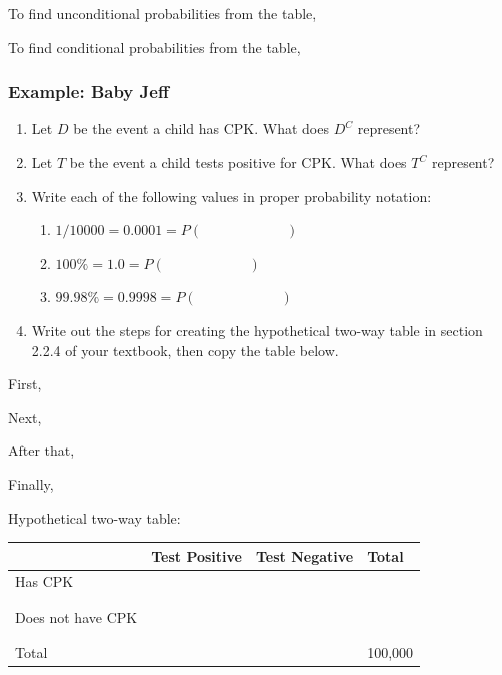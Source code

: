 \documentclass[
]{report}
\providecommand{\tightlist}{%
  \setlength{\itemsep}{0pt}\setlength{\parskip}{0pt}}
\newcommand{\rgs}{\vspace{12pt}} %
\newcommand{\rgi}{\hspace{24pt}}  %
\begin{document}
\rgi \rgi To find unconditional probabilities from the table,
\rgs

\rgi \rgi To find conditional probabilities from the table,
\rgs

\hypertarget{example-baby-jeff}{%
\subsubsection*{Example: Baby Jeff}\label{example-baby-jeff}}

\begin{enumerate}
\def\labelenumi{\arabic{enumi}.}
\item
  Let \(D\) be the event a child has CPK. What does \(D^C\) represent?
  \rgs
\item
  Let \(T\) be the event a child tests positive for CPK. What does \(T^C\) represent?
  \rgs
\item
  Write each of the following values in proper probability notation:

  \begin{enumerate}
  \def\labelenumii{\alph{enumii}.}
  \tightlist
  \item
    \(1/10000 = 0.0001 = P( \hspace{1in} )\)\\
  \item
    \(100\% = 1.0 = P( \hspace{1in} )\)\\
  \item
    \(99.98\% = 0.9998 = P( \hspace{1in} )\)
  \end{enumerate}
\item
  Write out the steps for creating the hypothetical two-way table in section 2.2.4 of your textbook, then copy the table below.
\end{enumerate}

\rgi First,
\rgs

\rgi Next,
\rgs

\rgi After that,
\rgs

\rgi Finally,
\rgs

\newpage

\rgi Hypothetical two-way table:

\begin{center}
\begin{tabular}{|l|p{1.3in}|p{1.3in}|p{1.3in}|}
\hline
&   Test Positive   & Test Negative & Total \\ \hline
Has CPK     & & & \\
    & & & \\
    & & & \\ \hline
Does not have CPK       & & & \\
    & & & \\
    & & & \\ \hline     
Total & & & 100,000 \\ \hline
\end{tabular}
\end{center}
\rgs
\end{document}
